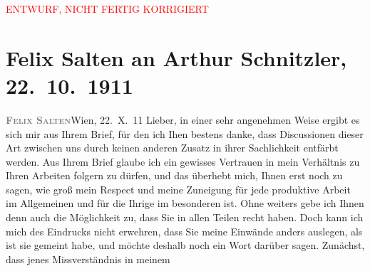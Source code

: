 
\begin{center}
            \textcolor{red}{ENTWURF, NICHT FERTIG KORRIGIERT}
                      \end{center}
            
         
         \renewcommand{\erwaehntePersonen}{Personen: Ottilie Salten, Olga Schnitzler}
         \renewcommand{\erwaehnteOrte}{Orte: Berlin, Wien}
         \renewcommand{\erwaehnteWerke}{Werke: Burgtheater. »Das weite Land.« Tragikomödie von Arthur Schnitzler, Das weite Land. Tragikomödie in fünf Akten, Der gute König Dagobert. Lustspiel in vier Aufzügen, Pester Lloyd}
               \section[Felix Salten an Arthur Schnitzler, 22. 10. 1911]{ Felix Salten an Arthur Schnitzler, 22. 10. 1911}\nopagebreak{}\rehead{ }\begin{ledgroupsized}[t]{13cm}\normalsize\beginnumbering \toendnotes[C]{\smallbreak\pagebreak[2]} 
\toendnotes[C]{\smallbreak}\pstart
           \noindent{}{\pb}\textcolor{gray}{\textbf{\textsc{Felix Salten}}}\hfill Wien, 22. X. 11\pend
           \pstart
           Lieber, in einer sehr angenehmen Weise ergibt es sich mir aus Ihrem
               Brief, für den ich Ihen bestens danke, dass Discussionen dieser Art zwischen uns
               durch keinen anderen Zusatz in ihrer Sachlichkeit entfärbt werden. Aus Ihrem Brief
               glaube ich ein gewisses Vertrauen in mein Verhältnis zu Ihren Arbeiten folgern zu
               dürfen, und das überhebt mich, Ihnen erst noch zu sagen, wie groß mein Respect und
               meine Zuneigung für jede produktive Arbeit im Allgemeinen und für die Ihrige im
               besonderen ist. Ohne weiters gebe ich Ihnen denn auch die Möglichkeit zu, dass Sie in
               allen Teilen recht haben. Doch kann ich mich des Eindrucks nicht erwehren, dass Sie
               meine Einwände anders auslegen, als ist sie gemeint habe, und möchte deshalb noch ein
               Wort darüber sagen. Zunächst, dass jenes Missverständnis in meinem \label{K_L03554-1v}
\end{ledgroupsized}
